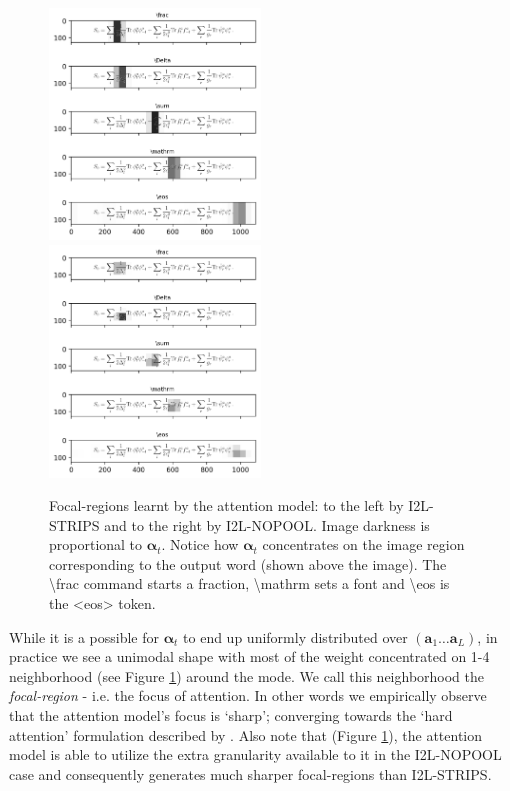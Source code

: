 \documentclass{article}
\begin{document}
\begin{figure}
	\includegraphics[width=0.5\textwidth]{125e0edbdc14c16_STRIPS_scan.png}
	\includegraphics[width=0.5\textwidth]{125e0edbdc14c16_NOPOOL_scan.png}
	\caption[Visual Attention]{Focal-regions learnt by the attention model: to the left by I2L-STRIPS and to the right by I2L-NOPOOL. Image darkness is proportional to $\boldsymbol{\alpha}_t$. Notice how $\boldsymbol{\alpha}_t$ concentrates on the image region corresponding to the output word (shown above the image). The \textbackslash frac command starts a fraction, \textbackslash mathrm sets a font and \textbackslash eos is the <eos> token.}
	\label{fig-att}
\end{figure}
While it is a possible for $\boldsymbol{\alpha}_t$ to end up uniformly distributed over $( \boldsymbol{a}_1  \ldots  \boldsymbol{a}_L )$, in practice we see a unimodal shape with most of the weight concentrated on 1-4 neighborhood (see Figure \ref{fig-att}) around the mode. We call this neighborhood the \emph{focal-region} - i.e. the focus of attention. In other words we empirically observe that the attention model's focus is `sharp'; converging towards the `hard attention' formulation described by \citet{Xu2015ShowAA}. Also note that (Figure \ref{fig-att}), the attention model is able to utilize the extra granularity available to it in the I2L-NOPOOL case and consequently generates much sharper focal-regions than I2L-STRIPS.
\end{document}
